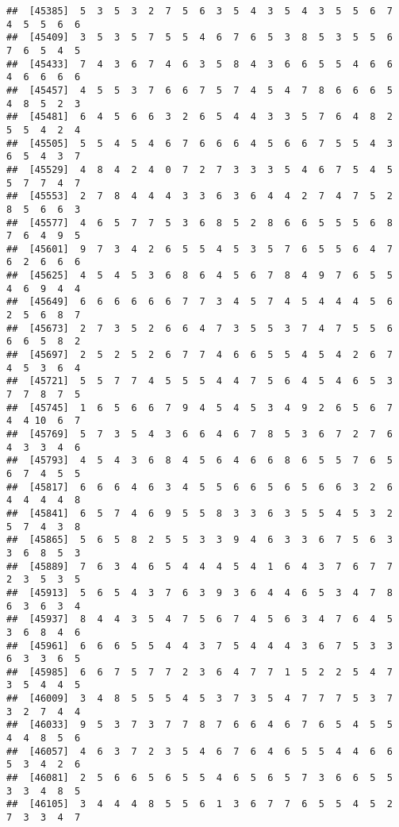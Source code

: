\documentclass[
]{book}
\begin{document}
\begin{verbatim}
##  [45385]  5  3  5  3  2  7  5  6  3  5  4  3  5  4  3  5  5  6  7  4  5  5  6  6
##  [45409]  3  5  3  5  7  5  5  4  6  7  6  5  3  8  5  3  5  5  6  7  6  5  4  5
##  [45433]  7  4  3  6  7  4  6  3  5  8  4  3  6  6  5  5  4  6  6  4  6  6  6  6
##  [45457]  4  5  5  3  7  6  6  7  5  7  4  5  4  7  8  6  6  6  5  4  8  5  2  3
##  [45481]  6  4  5  6  6  3  2  6  5  4  4  3  3  5  7  6  4  8  2  5  5  4  2  4
##  [45505]  5  5  4  5  4  6  7  6  6  6  4  5  6  6  7  5  5  4  3  6  5  4  3  7
##  [45529]  4  8  4  2  4  0  7  2  7  3  3  3  5  4  6  7  5  4  5  5  7  7  4  7
##  [45553]  2  7  8  4  4  4  3  3  6  3  6  4  4  2  7  4  7  5  2  8  5  6  6  3
##  [45577]  4  6  5  7  7  5  3  6  8  5  2  8  6  6  5  5  5  6  8  7  6  4  9  5
##  [45601]  9  7  3  4  2  6  5  5  4  5  3  5  7  6  5  5  6  4  7  6  2  6  6  6
##  [45625]  4  5  4  5  3  6  8  6  4  5  6  7  8  4  9  7  6  5  5  4  6  9  4  4
##  [45649]  6  6  6  6  6  6  7  7  3  4  5  7  4  5  4  4  4  5  6  2  5  6  8  7
##  [45673]  2  7  3  5  2  6  6  4  7  3  5  5  3  7  4  7  5  5  6  6  6  5  8  2
##  [45697]  2  5  2  5  2  6  7  7  4  6  6  5  5  4  5  4  2  6  7  4  5  3  6  4
##  [45721]  5  5  7  7  4  5  5  5  4  4  7  5  6  4  5  4  6  5  3  7  7  8  7  5
##  [45745]  1  6  5  6  6  7  9  4  5  4  5  3  4  9  2  6  5  6  7  4  4 10  6  7
##  [45769]  5  7  3  5  4  3  6  6  4  6  7  8  5  3  6  7  2  7  6  4  3  3  4  6
##  [45793]  4  5  4  3  6  8  4  5  6  4  6  6  8  6  5  5  7  6  5  6  7  4  5  5
##  [45817]  6  6  6  4  6  3  4  5  5  6  6  5  6  5  6  6  3  2  6  4  4  4  4  8
##  [45841]  6  5  7  4  6  9  5  5  8  3  3  6  3  5  5  4  5  3  2  5  7  4  3  8
##  [45865]  5  6  5  8  2  5  5  3  3  9  4  6  3  3  6  7  5  6  3  3  6  8  5  3
##  [45889]  7  6  3  4  6  5  4  4  4  5  4  1  6  4  3  7  6  7  7  2  3  5  3  5
##  [45913]  5  6  5  4  3  7  6  3  9  3  6  4  4  6  5  3  4  7  8  6  3  6  3  4
##  [45937]  8  4  4  3  5  4  7  5  6  7  4  5  6  3  4  7  6  4  5  3  6  8  4  6
##  [45961]  6  6  6  5  5  4  4  3  7  5  4  4  4  3  6  7  5  3  3  6  3  3  6  5
##  [45985]  6  6  7  5  7  7  2  3  6  4  7  7  1  5  2  2  5  4  7  3  5  4  4  5
##  [46009]  3  4  8  5  5  5  4  5  3  7  3  5  4  7  7  7  5  3  7  3  2  7  4  4
##  [46033]  9  5  3  7  3  7  7  8  7  6  6  4  6  7  6  5  4  5  5  4  4  8  5  6
##  [46057]  4  6  3  7  2  3  5  4  6  7  6  4  6  5  5  4  4  6  6  5  3  4  2  6
##  [46081]  2  5  6  6  5  6  5  5  4  6  5  6  5  7  3  6  6  5  5  3  3  4  8  5
##  [46105]  3  4  4  4  8  5  5  6  1  3  6  7  7  6  5  5  4  5  2  7  3  3  4  7

\end{verbatim}
\end{document}
